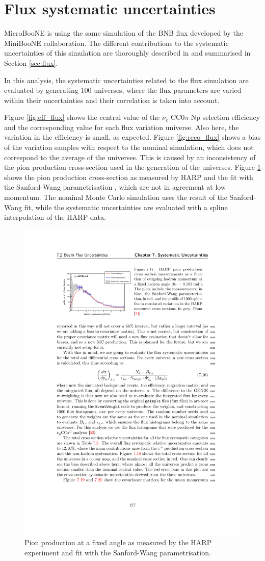 \section{Flux systematic uncertainties}
MicroBooNE is using the same simulation of the BNB flux developed by the MiniBooNE collaboration. The different contributions to the systematic uncertainties of this simulation are thoroughly described in \cite{AguilarArevalo:2008yp} and summarised in Section \ref{sec:flux}.

In this analysis, the systematic uncertainties related to the flux simulation are evaluated by generating 100 universes, where the flux parameters are varied within their uncertainties and their correlation is taken into account. 

Figure \ref{fig:eff_flux} shows the central value of the $\nu_{e}$ CC0$\pi$-Np selection efficiency and the corresponding value for each flux variation universe. Also here, the variation in the efficiency is small, as expected. 
Figure \ref{fig:reco_flux} shows a bias of the variation samples with respect to the nominal simulation, which does not correspond to the average of the universes. This is caused by an inconsistency of the pion production cross-section used in the generation of the universes. 
Figure \ref{fig:harp} shows the pion production cross-section as measured by HARP \cite{Catanesi:2007ab} and the fit with the Sanford-Wang parametrisation \cite{Sanford:1967zza}, which are not in agreement at low momentum. The nominal Monte Carlo simulation uses the result of the Sanford-Wang fit, while the systematic uncertainties are evaluated with a spline interpolation of the HARP data.

\begin{figure}[htbp]
\centering  
\includegraphics[width=0.75\linewidth]{figures/harp.pdf}
\caption{Pion production at a fixed angle as measured by the HARP experiment and fit with the Sanford-Wang parametrisation.}\label{fig:harp}
\end{figure}

